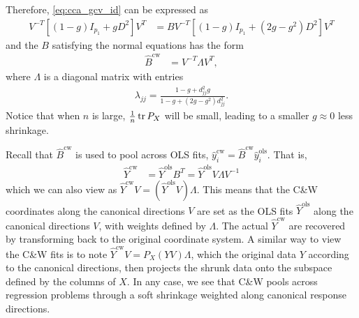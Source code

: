 \documentclass{article}
\begin{document}
Therefore, \ref{eq:cca_gcv_id} can be expressed as
\begin{align*}
  V^{-T}\left[\left(1 - g\right)I_{p_{1}} + gD^{2}\right]V^{T} &=
  BV^{-T}\left[\left(1 - g\right)I_{p_{1}} + \left(2g -
      g^2\right)D^{2}\right]V^{T}
\end{align*}
and the $B$ satisfying the normal equations has the form
\begin{align*}
\hat{B}^{\text{cw}} &= V^{-T}\Lambda V^{T},
\end{align*}
where $\Lambda$ is a diagonal matrix with entries
\begin{align*}
\lambda_{jj} = \frac{1 - g + d_{jj}^{2}g}{1 - g + \left(2g -
    g^{2}\right)d_{jj}^{2}}.
\end{align*}
Notice that when $n$ is large, $\frac{1}{n}\mathop\mathrm{tr} P_{X}$ will be small, leading to
a smaller $g \approx 0$ less shrinkage.

Recall that $\hat{B}^{\text{cw}}$ is used to pool across OLS fits,
$\hat{y}_{i}^{\text{cw}} = \hat{B}^{\text{cw}}\hat{y}_{i}^{\text{ols}}$. That
is,
\begin{align*}
\hat{Y}^{\text{cw}} &= \hat{Y}^{\text{ols}}B^{T} =
\hat{Y}^{\text{ols}}V\Lambda V^{-1}
\end{align*}
which we can also view as $\hat{Y}^{\text{cw}}V =
\left(\hat{Y}^{\text{ols}}V\right)\Lambda$. This means that the C\&W coordinates
along the canonical directions $V$ are set as the OLS fits
$\hat{Y}^{\text{ols}}$ along the canonical directions $V$, with weights defined
by $\Lambda$. The actual $\hat{Y}^{\text{cw}}$ are recovered by transforming
back to the original coordinate system. A similar way to view the C\&W fits is
to note $\hat{Y}^{\text{cw}}V = P_{X}\left(YV\right)\Lambda$, which the original
data $Y$ according to the canonical directions, then projects the shrunk data
onto the subspace defined by the columns of $X$. In any case, we see that C\&W
pools across regression problems through a soft shrinkage weighted along
canonical response directions.
\end{document}
